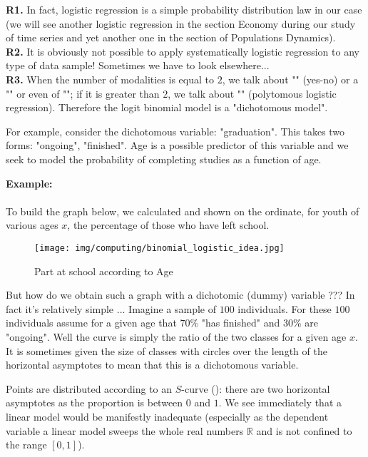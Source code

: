 	\begin{tcolorbox}[title=Remarks,colframe=black,arc=10pt]
	\textbf{R1.} In fact, logistic regression is a simple probability distribution law in our case (we will see another logistic regression in the section Economy during our study of time series and yet another one in the section of Populations Dynamics).\\
	
	\textbf{R2.} It is obviously not possible to apply systematically logistic regression to any type of data sample! Sometimes we have to look elsewhere...\\
	
	\textbf{R3.} When the number of modalities is equal to $2$, we talk about "" (yes-no) or a "" or even of ""; if it is greater than $2$, we talk about "" (polytomous logistic regression). Therefore the logit binomial model is a "dichotomous model".
	\end{tcolorbox}
	For example, consider the dichotomous variable: "graduation". This takes two forms: "ongoing", "finished". Age is a possible predictor of this variable and we seek to model the probability of completing studies as a function of age.
	\begin{tcolorbox}[colframe=black,colback=white,sharp corners]
	\textbf{{\Large {}}Example:}\\\\
	To build the graph below, we calculated and shown on the ordinate, for youth of various ages $x$, the percentage of those who have left school.
	\begin{figure}[H]
		\centering
		\texttt{[image: img/computing/binomial\_logistic\_idea.jpg]}
		\caption{Part at school according to Age}
	\end{figure}
	But how do we obtain such a graph with a dichotomic (dummy) variable ??? In fact it's relatively simple ... Imagine a sample of $100$ individuals. For these $100$ individuals assume for a given age that $70\%$ "has finished" and $30\%$ are "ongoing". Well the curve is simply the ratio of the two classes for a given age $x$. It is sometimes given the size of classes with circles over the length of the horizontal asymptotes to mean that this is a dichotomous variable.
	\end{tcolorbox}
	Points are distributed according to an $S$-curve (): there are two horizontal asymptotes as the proportion is between $0$ and $1$. We see immediately that a linear model would be manifestly inadequate (especially as the dependent variable a linear model sweeps the whole real numbers $\mathbb{R}$ and is not confined to the range $[0, 1]$).
	

